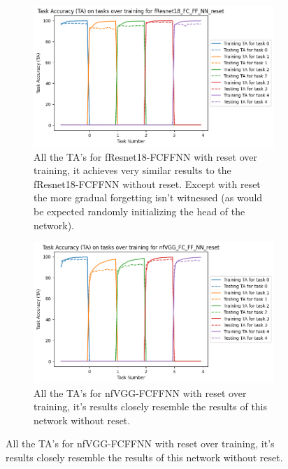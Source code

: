 \begin{figure}[ht]
  \begin{subfigure}[t]{0.4\textwidth}
     \includegraphics[width=\linewidth]{images/CIFAR10_CL/fResnet18_FC_FF_NN_reset_TA_task.png}
     \caption{All the TA's for fResnet18-FCFFNN with reset over training, it achieves very similar results to the fResnet18-FCFFNN without reset. Except with reset the more gradual forgetting isn't witnessed (as would be expected randomly initializing the head of the network).}
  \end{subfigure}
  \quad
  \begin{subfigure}[t]{0.4\textwidth}
    \includegraphics[width=\linewidth]{images/CIFAR10_CL/nfVGG_FC_FF_NN_reset_TA_task.png}
    \caption{All the TA's for nfVGG-FCFFNN with reset over training, it's results closely resemble the results of this network without reset.}
 \end{subfigure}
 
 \medskip %


\end{figure}
